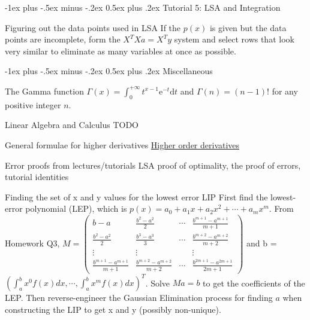 \documentclass[10pt,landscape]{article}
\makeatletter
\renewcommand{\section}{\@startsection{section}{1}{0mm}%
                                {-1ex plus -.5ex minus -.2ex}%
                                {0.5ex plus .2ex}%
                                {\normalfont\large\bfseries}}
\theoremstyle{definition}
\newcommand{\thistheoremname}{}
\newtheorem*{genericthm*}{\thistheoremname}
\newenvironment{namedthm*}[1]
{\renewcommand{\thistheoremname}{#1}\begin{genericthm*}}
{\end{genericthm*}}
\makeatother
\begin{document}
\begin{multicols}{3}
	\section{Tutorial 5: LSA and Integration}
	\begin{namedthm*}{Figuring out the data points used in LSA} If the \(p(x)\) is given but the data points are incomplete, form the \(X^TXa=X^Ty\) system and select rows that look very similar to eliminate as many variables at once as possible.
	\end{namedthm*}

	\section{Miscellaneous}
	\begin{namedthm*}{The Gamma function} \(\Gamma(x)=\int_{0}^{+\infty} t^{x-1} \mathrm{e}^{-t} \mathrm{d} t\) and \(\Gamma(n)=(n-1) !\) for any positive integer \(n\).
	\end{namedthm*}
	\begin{namedthm*}{Linear Algebra and Calculus}
		\color{red} TODO
	\end{namedthm*}
	\begin{namedthm*}{General formulae for higher derivatives}
		\hyperref{https://www.math24.net/higher-order-derivatives/}{}{}{Higher order derivatives}
	\end{namedthm*}
	\begin{namedthm*}{Error proofs from lectures/tutorials}
		\color{red} LSA proof of optimality, the proof of errors, tutorial identities
	\end{namedthm*}
	\begin{namedthm*}{Finding the set of x and y values for the lowest error LIP}
		First find the lowest-error polynomial (LEP), which is \(p(x)=a_{0}+a_{1} x+a_{2} x^{2}+\cdots+a_{m} x^{m}\). From Homework Q3, \(M=\left(\begin{array}{cccc}{b-a} & {\frac{b^{2}-a^{2}}{2}} & {\cdots} & {\frac{b^{m+1}-a^{m+1}}{m+1}} \\ {\frac{b^{2}-a^{2}}{2}} & {\frac{b^{3}-a^{3}}{3}} & {\cdots} & {\frac{b^{m+2}-a^{m+2}}{m+2}} \\ {\vdots} & {\vdots} & {} & {\vdots} \\ {\frac{b^{m+1}-a^{m+1}}{m+1}} & {\frac{b^{m+2}-a^{m+2}}{m+2}} & {\cdots} & {\frac{b^{2 m+1}-a^{2 m+1}}{2 m+1}}\end{array}\right)\) and b = \(\left(\int_{a}^{b} x^{0} f(x) d x, \cdots, \int_{a}^{b} x^{m} f(x) d x\right)^{T}\). Solve \(Ma = b\) to get the coefficients of the LEP. Then reverse-engineer the Gaussian Elimination process for finding \(a\) when constructing the LIP to get x and y (possibly non-unique).
	\end{namedthm*}

\end{multicols}
\end{document}
